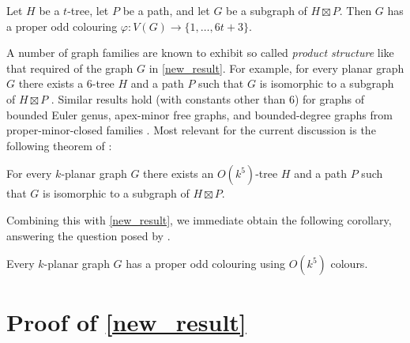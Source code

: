 \documentclass{patmorin}
\begin{document}
\begin{thm}\label{new_result}
  Let $H$ be a $t$-tree, let $P$ be a path, and let $G$ be a subgraph of $H\boxtimes P$. Then $G$ has a proper odd colouring $\varphi:V(G)\to\{1,\ldots,6t+3\}$.
\end{thm}

A number of graph families are known to exhibit so called \emph{product structure} like that required of the graph $G$ in \cref{new_result}.  For example, for every planar graph $G$ there exists a $6$-tree $H$ and a path $P$ such that $G$ is isomorphic to a subgraph of $H\boxtimes P$ \cite{ueckerdt.wood.ea:improved}.  Similar results hold (with constants other than $6$) for graphs of bounded Euler genus, apex-minor free graphs, and bounded-degree graphs from proper-minor-closed families \cite{dujmovic.joret.ea:planar,dujmovic.esperet.ea:clustered}.  Most relevant for the current discussion is the following theorem of \citet{dujmovic.morin.ea:structure}:

\begin{thm}\label{k_planar}
  For every $k$-planar graph $G$ there exists an $O(k^5)$-tree $H$ and a path $P$ such that $G$ is isomorphic to a subgraph of $H\boxtimes P$.
\end{thm}

Combining this with \cref{new_result}, we immediate obtain the following corollary, answering the question posed by \citet{cranston.lafferty.ea:note}.

\begin{cor}
  Every $k$-planar graph $G$ has a proper odd colouring using $O(k^5)$ colours.
\end{cor}

\section{Proof of \cref{new_result}}
\end{document}

